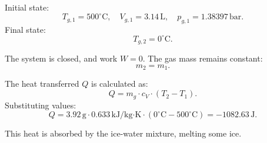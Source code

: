 Initial state:  
\[
T_{g,1} = 500^\circ\text{C}, \quad V_{g,1} = 3.14 \, \text{L}, \quad p_{g,1} = 1.38397 \, \text{bar}.
\]  
Final state:  
\[
T_{g,2} = 0^\circ\text{C}.
\]  

The system is closed, and work \( W = 0 \). The gas mass remains constant:  
\[
m_2 = m_1.
\]  

The heat transferred \( Q \) is calculated as:  
\[
Q = m_g \cdot c_V \cdot (T_2 - T_1).
\]  
Substituting values:  
\[
Q = 3.92 \, \text{g} \cdot 0.633 \, \text{kJ/kg·K} \cdot (0^\circ\text{C} - 500^\circ\text{C}) = -1082.63 \, \text{J}.
\]  

This heat is absorbed by the ice-water mixture, melting some ice.
